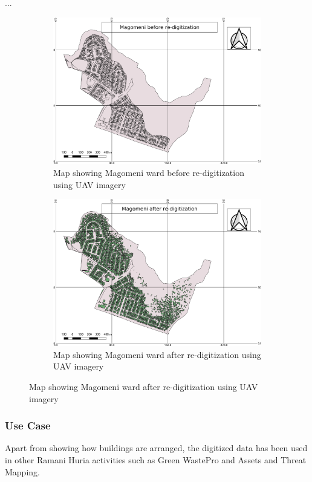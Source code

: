 \documentclass[a4paper,12pt,twoside]{article}
\begin{document}
... 
\begin{figure}
  \begin{subfigure}[b]{0.5\textwidth}
    \includegraphics[width=\textwidth]{Magomeni_Before_Re-digitization.png}
   \color{RHgreen}\caption{Map showing Magomeni ward before re-digitization using UAV imagery}
    \label{fig:1}
  \end{subfigure}
  \begin{subfigure}[b]{0.5\textwidth}
    \includegraphics[width=\textwidth]{Magomeni_After_Re-digitization.png}
    \color{RHgreen}\caption{Map showing Magomeni ward after re-digitization using UAV imagery}
    \label{fig:2}
  \end{subfigure}
\end{figure}

\subsubsection{Use Case}
Apart from showing how buildings are arranged, the digitized data has been used in other Ramani Huria activities such as Green WastePro and Assets and Threat Mapping.
\end{document}
